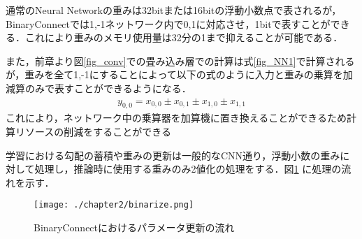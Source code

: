 通常のNeural Networkの重みは32bitまたは16bitの浮動小数点で表されるが，BinaryConnectでは1,-1ネットワーク内で0,1に対応させ，1bitで表すことができる．これにより重みのメモリ使用量は32分の1まで抑えることが可能である．

また，前章より図\ref{fig_conv}での畳み込み層での計算は式\ref{fig_NN1}で計算されるが，重みを全て1,-1にすることによって以下の式のように入力と重みの乗算を加減算のみで表すことができるようになる．
\begin{align}
  y_{0,0} = x_{0,0} \pm x_{0,1} \pm x_{1,0} \pm x_{1,1}
\end{align}
これにより，ネットワーク中の乗算器を加算機に置き換えることができるため計算リソースの削減をすることができる

学習における勾配の蓄積や重みの更新は一般的なCNN通り，浮動小数の重みに対して処理し，推論時に使用する重みのみ2値化の処理をする．図\ref{fig_binarize} に処理の流れを示す\cite{courbariaux2016binaryconnect}．
\begin{figure}[htbp]
  \begin{center}
    \texttt{[image: ./chapter2/binarize.png]}
    \caption{BinaryConnectにおけるパラメータ更新の流れ}
    \label{fig_binarize}
  \end{center}
\end{figure}